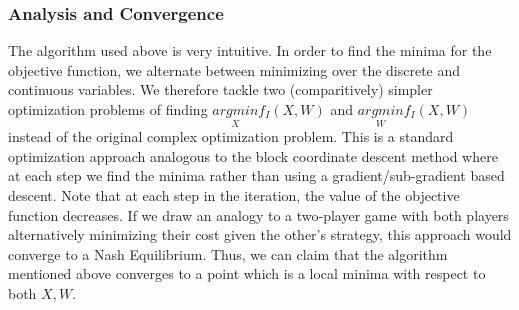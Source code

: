 \begin{algorithm}
\medskip{}



\medskip{}

\caption{$solve(I)$}
\end{algorithm}



\subsubsection*{Analysis and Convergence}

The algorithm used above is very intuitive. In order to find the minima
for the objective function, we alternate between minimizing over the
discrete and continuous variables. We therefore tackle two (comparitively)
simpler optimization problems of finding $\underset{X}{argmin}f_{I}(X,W)$
and $\underset{W}{argmin}f_{I}(X,W)$ instead of the original complex
optimization problem. This is a standard optimization approach analogous
to the block coordinate descent method where at each step we find
the minima rather than using a gradient/sub-gradient based descent.
Note that at each step in the iteration, the value of the objective
function decreases. If we draw an analogy to a two-player game with
both players alternatively minimizing their cost given the other's
strategy, this approach would converge to a Nash Equilibrium. Thus,
we can claim that the algorithm mentioned above converges to a point
which is a local minima with respect to both $X,W$.